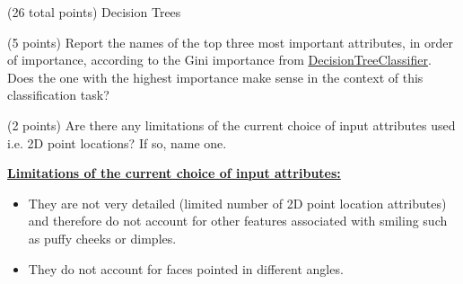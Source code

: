 \documentclass[12pt]{article}
\begin{document}
\begin{question}{(26 total points) Decision Trees}
\begin{subquestion}
\end{subquestion}


%
%
\begin{subquestion}{(5 points) 
Report the names of the top three most important attributes, in order of importance, according to the Gini importance from \href{https://scikit-learn.org/0.19/modules/generated/sklearn.tree.DecisionTreeClassifier.html}{DecisionTreeClassifier}. 
Does the one with the highest importance make sense in the context of this classification task? \\
}





\end{subquestion}



%
%
\begin{subquestion}{(2 points) 
Are there any limitations of the current choice of input attributes used i.e. 2D point locations? If so, name one. 
}


\begin{answerbox}{10em}
\large{\textbf{\underline{Limitations of the current choice of input attributes:}}}
\normalsize{
\begin{itemize}
    \item They are not very detailed (limited number of 2D point location attributes) and therefore do not account for other features associated with smiling such as puffy cheeks or dimples.
    \item They do not account for faces pointed in different angles.
\end{itemize}
}
\end{answerbox}



\end{subquestion}


\end{question}
\end{document}
